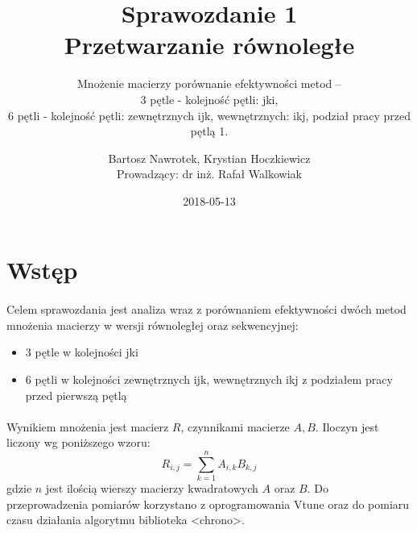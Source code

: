 \documentclass{scrartcl}
\title{Sprawozdanie 1 \\ Przetwarzanie równoległe}
\subtitle{Mnożenie macierzy porównanie efektywności metod –\\
3 pętle - kolejność pętli: jki,\\
6 pętli - kolejność pętli: zewnętrznych ijk, wewnętrznych: ikj, podział pracy przed pętlą 1.}
\date{2018-05-13}
\author{Bartosz Nawrotek, Krystian Hoczkiewicz \\
Prowadzący: dr inż. Rafał Walkowiak}
\begin{document}
\maketitle
\section{Wstęp}
\paragraph{}Celem sprawozdania jest analiza wraz z porównaniem efektywności dwóch metod mnożenia macierzy w wersji równoległej oraz sekwencyjnej:
\begin{itemize}
\item {3 pętle w kolejności jki}
\item {6 pętli w kolejności zewnętrznych ijk, wewnętrznych ikj z podziałem pracy przed pierwszą pętlą}
\end{itemize}
\paragraph{}Wynikiem mnożenia jest macierz $R$, czynnikami macierze $A, B$. Iloczyn jest liczony wg poniższego wzoru:
\begin{equation}
R_{i, j} = \sum_{k = 1}^{n}{A_{i, k}B_{k, j}}
\end{equation}
gdzie $n$ jest ilością wierszy macierzy kwadratowych $A$ oraz $B$.
Do przeprowadzenia pomiarów korzystano z oprogramowania Vtune oraz do pomiaru czasu działania algorytmu biblioteka <chrono>.
\end{document}
